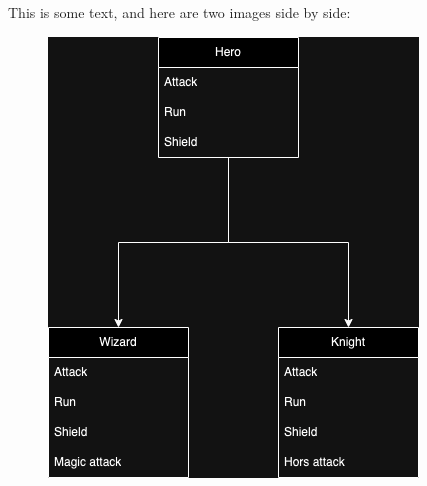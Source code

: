 \documentclass{article}
\begin{document}
    This is some text, and here are two images side by side:

    \begin{figure}[h]
        \begin{minipage}[t]{0.48\linewidth}
            \includegraphics[width=\textwidth]{test.png}
        \end{minipage}
        \hfill
        \begin{minipage}[t]{0.48\linewidth}

\end{minipage}
\end{figure}
\end{document}
